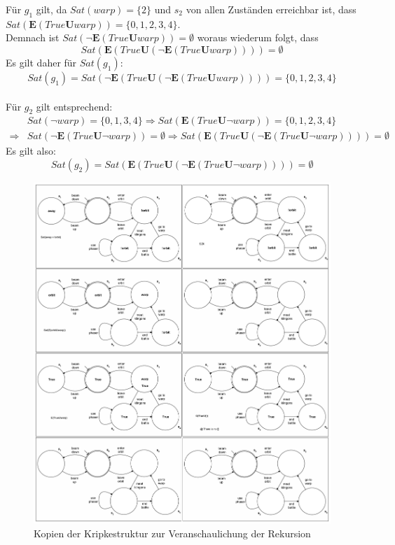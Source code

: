 \documentclass[12pt, paper=a4]{article}
\begin{document}
Für $g_{1}$ gilt, da $Sat(warp)=\{2\}$ und $s_{2}$ von allen Zuständen erreichbar ist, dass $Sat(\mathbf{E}(True\mathbf{U}warp))=\{0,1,2,3,4\}$.\\
Demnach ist $Sat(\neg\mathbf{E}(True\mathbf{U}warp))=\emptyset$ woraus wiederum folgt, dass \[Sat(\mathbf{E}(True\mathbf{U}(\neg\mathbf{E}(True\mathbf{U}warp))))=\emptyset\]
Es gilt daher für $Sat(g_{1})$:\[Sat(g_{1})=Sat(\neg\mathbf{E}(True\mathbf{U}(\neg\mathbf{E}(True\mathbf{U}warp))))=\{0,1,2,3,4\}\]
\\
Für $g_{2}$ gilt entsprechend:
\begin{align*}
&Sat(\neg warp)=\{0,1,3,4\} \Rightarrow Sat(\mathbf{E}(True\mathbf{U}\neg warp))=\{0,1,2,3,4\} \\
	\Rightarrow& Sat(\neg\mathbf{E}(True\mathbf{U}\neg warp))=\emptyset \Rightarrow Sat(\mathbf{E}(True\mathbf{U}(\neg \mathbf{E}(True\mathbf{U}\neg warp))))=\emptyset
\end{align*}
Es gilt also: \[Sat(g_{2})=Sat(\mathbf{E}(True\mathbf{U}(\neg \mathbf{E}(True\mathbf{U}\neg warp))))=\emptyset\]
\begin{figure}[h!]
\includegraphics[scale=0.3]{G1-A05-GoettHoelSchm-rekursionTemplate}
\caption{Kopien der Kripkestruktur zur Veranschaulichung der Rekursion}
\end{figure}
\end{document}
